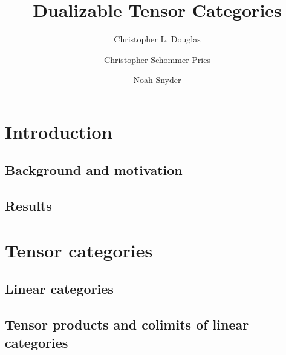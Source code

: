 \documentclass{amsart}
\begin{document}
\title{Dualizable Tensor Categories}

\begin{abstract}

\end{abstract}
	
\author{Christopher L. Douglas}
\address{Department of Mathematics, University of California, Berkeley, CA 94720, USA}
	
\author{Christopher Schommer-Pries}
\address{}
\email{}

\author{Noah Snyder}
\address{}
\email{}

\maketitle	


\section{Introduction}

\subsection{Background and motivation}

\subsection{Results}

\section{Tensor categories}



\subsection{Linear categories}

\subsection{Tensor products and colimits of linear categories}
\end{document}
